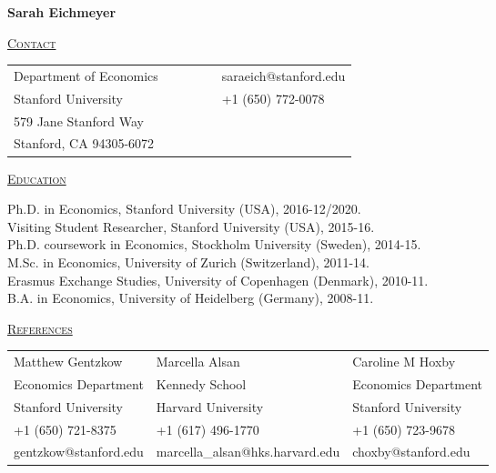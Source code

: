 \documentclass[letterpaper,11pt]{article}
\begin{document}
\begin{center}
\Large{\textbf{Sarah Eichmeyer}}
\end{center}



 \bigskip


 \underline {\textsc{Contact}}
 
\begin{tabular}{@{}l@{}cll@{}cl}
Department of Economics &&&&& saraeich@stanford.edu \\
Stanford University &&&&& +1 (650) 772-0078 \\
579 Jane Stanford Way && &&& \\
Stanford, CA 94305-6072 & & 
\end{tabular}

\bigskip
 
\underline {\textsc{Education}}

Ph.D. in Economics, Stanford University (USA), 2016-12/2020. \\
Visiting Student Researcher, Stanford University (USA), 2015-16. \\
Ph.D. coursework in Economics, Stockholm University (Sweden), 2014-15. \\
M.Sc. in Economics, University of Zurich (Switzerland), 2011-14. \\
Erasmus Exchange Studies, University of Copenhagen (Denmark), 2010-11. \\
B.A. in Economics, University of Heidelberg (Germany), 2008-11.


\bigskip
 
\underline {\textsc{References}}



\begin{tabularx}{\textwidth}{@{}X@{}X@{}l}
Matthew Gentzkow & Marcella Alsan  & Caroline M Hoxby \\
Economics Department  & Kennedy School & Economics Department  \\
Stanford University & Harvard University & Stanford University \\ 
+1 (650) 721-8375 & +1 (617) 496-1770 & +1 (650) 723-9678  \\
gentzkow@stanford.edu & marcella\_alsan@hks.harvard.edu & choxby@stanford.edu \\
\end{tabularx}

\bigskip
 
\end{document}
